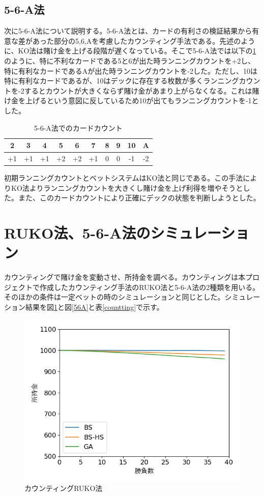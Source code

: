 \subsection{5-6-A法}
次に5-6-A法について説明する。5-6-A法とは、カードの有利さの検証結果から有意な差があった部分の5,6,Aを考慮したカウンティング手法である。先述のように、KO法は賭け金を上げる段階が遅くなっている。そこで5-6-A法では以下の\ref{56Acount}のように、特に不利なカードである5と6が出た時ランニングカウントを+2し、特に有利なカードであるAが出た時ランニングカウントを-2した。ただし、10は特に有利なカードであるが、10はデックに存在する枚数が多くランニングカウントを-2するとカウントが大きくならず賭け金があまり上がらなくなる。これは賭け金を上げるという意図に反しているため10が出てもランニングカウントを-1とした。

\begin{table}[H]
    \centering
    \label{56Acount}
    \caption{5-6-A法でのカードカウント}
    \begin{tabular}{|c|c|c|c|c|c|c|c|c|c|} \hline
      2&3&4&5&6&7&8&9&10&A \\ \hline
      +1&+1&+1&+2&+2&+1&0&0&-1&-2 \\ \hline
    \end{tabular}
\end{table}

初期ランニングカウントとベットシステムはKO法と同じである。この手法によりKO法よりランニングカウントを大きくし賭け金を上げ利得を増やそうとした。また、このカードカウントにより正確にデックの状態を判断しようとした。

\section{RUKO法、5-6-A法のシミュレーション}
カウンティングで賭け金を変動させ、所持金を調べる。カウンティングは本プロジェクトで作成したカウンティング手法のRUKO法と5-6-A法の2種類を用いる。そのほかの条件は一定ベットの時のシミュレーションと同じとした。シミュレーション結果を図\ref{RUKO}と図\ref{56A}と表\ref{countting}で示す。


\begin{figure}[H]
 \begin{center} 
  \includegraphics[width=0.7\linewidth]{./figure/betsimulation-RUKO}
  \caption{カウンティングRUKO法\label{RUKO}}
 \end{center}
\end{figure}

